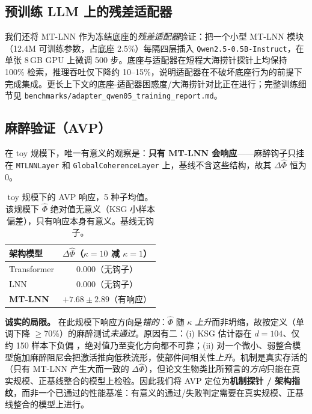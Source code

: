 \documentclass[11pt]{article}
\theoremstyle{definition}
\begin{document}
\subsection{预训练 LLM 上的残差适配器}
我们还将 MT-LNN 作为冻结底座的\emph{残差适配器}验证：把一个小型 MT-LNN 模块（12.4M 可训练参数，占底座 2.5\%）每隔四层插入 \texttt{Qwen2.5-0.5B-Instruct}，在单张 8\,GB GPU 上微调 500 步。底座与适配器在短程大海捞针探针上均保持 100\% 检索，推理吞吐仅下降约 10--15\%，说明适配器在不破坏底座行为的前提下完成集成。更长上下文的底座-适配器困惑度/大海捞针对比正在进行；完整训练细节见 \texttt{benchmarks/adapter\_qwen05\_training\_report.md}。

\subsection{麻醉验证（AVP）}
在 toy 规模下，唯一有意义的观察是：\textbf{只有 MT-LNN 会响应}——麻醉钩子只挂在 \texttt{MTLNNLayer} 和 \texttt{GlobalCoherenceLayer} 上，基线不含这些结构，故其 $\Delta\hat{\Phi}$ 恒为 0。

\begin{table}[h]
\centering
\caption{toy 规模下的 AVP 响应，5 种子均值。该规模下 $\hat{\Phi}$ 绝对值无意义（KSG 小样本偏差），只有响应本身有意义。基线无钩子。}
\label{tab:anesth}
\begin{tabular}{lc}
\toprule
架构模型 & $\Delta\hat{\Phi}$（$\kappa{=}10$ 减 $\kappa{=}1$）\\
\midrule
Transformer & $0.000$（无钩子）\\
LNN & $0.000$（无钩子）\\
\textbf{MT-LNN} & $\mathbf{+7.68 \pm 2.89}$（有响应）\\
\bottomrule
\end{tabular}
\end{table}

\textbf{诚实的局限。} 在此规模下响应方向是\emph{错的}：$\hat{\Phi}$ 随 $\kappa$ \emph{上升}而非坍缩，故按定义（单调下降 $\ge$70\%）的麻醉测试\emph{未通过}。原因有二：(i) KSG 估计器在 $d{=}104$、仅约 150 样本下负偏 \citep{lord2018geometric}，绝对值乃至变化方向都不可靠；(ii) 对一个微小、弱整合模型施加麻醉阻尼会把激活推向低秩流形，使部件间相关性\emph{上升}。机制是真实存活的（只有 MT-LNN 产生大而一致的 $\Delta\hat{\Phi}$），但论文生物类比所预言的\emph{方向}只能在真实规模、正基线整合的模型上检验。因此我们将 AVP 定位为\textbf{机制探针 / 架构指纹}，而非一个已通过的性能基准：有意义的通过/失败判定需要在真实规模、正基线整合的模型上进行。

\end{document}
